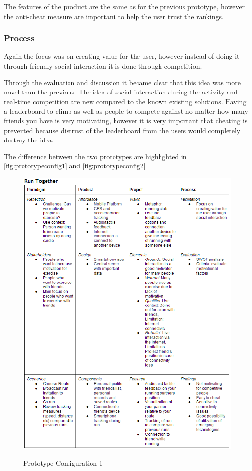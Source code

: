 The features of the product are the same as for the previous prototype, however the anti-cheat measure are important to help the user trust the rankings.

\subsubsection{Process}
Again the focus was on creating value for the user, however instead of doing it through friendly social interaction it is done through competition. 

Through the evaluation and discussion it became clear that this idea was more novel than the previous. The idea of social interaction during the activity and real-time competition are new compared to the known existing solutions. Having a leaderboard to climb as well as people to compete against no matter how many friends you have is very motivating, however it is very important that cheating is prevented because distrust of the leaderboard from the users would completely destroy the idea.

The difference between the two prototypes are highlighted in \autoref{fig:prototypeconfig1} and \autoref{fig:prototypeconfig2}

\begin{figure}[ht!]
\begin{center}
 \label{fig:prototypeconfig1}
 \includegraphics[width=\textwidth]{img/prototypeconfig1.png}
 \caption{Prototype Configuration 1}
\end{center}
\end{figure}

